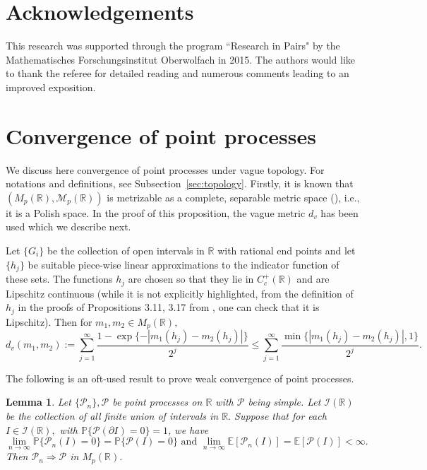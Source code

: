 \documentclass[12pt]{amsart}
\renewcommand{\Pr}{\mathbb{P}}
\newtheorem{lemma}[theorem]{Lemma}
\numberwithin{equation}{section}
\numberwithin{theorem}{section}
\newcommand{\Real}{\mathbb R}
\newcommand{\1}{\mathbf{1}}
\def\M{\mathcal{M}}
\def\IR{\mathcal{I}(\bR)}
\def\sP{\mathscr{P}}
\def\bR{\mathbb{R}}
\def\ccR{C_{c}^{+}(\bR)}
\def\EP{\mathbb{E}}
\begin{document}
\section*{Acknowledgements}
This research was supported through the program ``Research in Pairs" by the Mathematisches Forschungsinstitut Oberwolfach in 2015. The authors would like to thank the referee for detailed reading and numerous comments leading to an improved exposition.
\appendix	
\label{sec:app}

\section{Convergence of point processes}
\label{app:pp}
%

We discuss here convergence of point processes under vague topology. For notations and definitions, see Subsection~\ref{sec:topology}. Firstly, it is known that $(M_p(\Real), \M_p(\Real))$ is metrizable as a complete, separable metric space (\cite[Chapter 3, Proposition 3.17]{resnick2013extreme}), i.e., it is a Polish space. In the proof of this proposition, the vague metric $d_v$ has been used which we describe next.

Let $\{G_i\}$ be the collection of open intervals in $\Real$ with rational end points and let $\{h_j\}$ be suitable piece-wise linear approximations to the indicator function of these sets. The functions $h_j$ are chosen so that they lie in $\ccR$ and are Lipschitz continuous (while it is not explicitly highlighted, from the definition of $h_j$ in the proofs of Propositions 3.11, 3.17 from \cite[Chapter 3]{resnick2013extreme}, one can check that it is Lipschitz). Then for $m_1, m_2 \in M_p(\Real),$
%
%
%
\begin{equation}
\label{eqn:vague_metric}
d_v(m_1, m_2) := \sum_{j = 1}^{\infty} \frac{1 - \exp\{- |m_1(h_j) - m_2(h_j)|\}}{2^j}
\leq \sum_{j = 1}^{\infty} \frac{ \min \{|m_1(h_j) - m_2(h_j)|, 1\}}{2^j}.
\end{equation}

The following is an oft-used result to prove weak convergence of point processes.
%			
\begin{lemma}\cite[Proposition 3.22]{resnick2013extreme}
\label{lem:KallenbergResult}
Let $\{\sP_n\}, \sP$ be point processes on $\bR$ with $\sP$ being simple. Let $\IR$ be the collection of all finite union of intervals in $\bR.$ Suppose that for each $I \in \IR,$ with 		$\Pr\{\sP(\partial I) = 0\} = 1$, we have
%
\[
\lim_{n \to \infty} \Pr\{\sP_{n}(I) = 0\} = \Pr\{\sP(I) = 0\} \, \, \mbox{and} \, \,
\lim_{n \to \infty} \EP[\sP_{n}(I)] = \EP[\sP(I)] < \infty.
\]
%
Then $\sP_{n} \Rightarrow \sP$ in $M_{p}(\bR).$
\end{lemma}
%				
\end{document}
